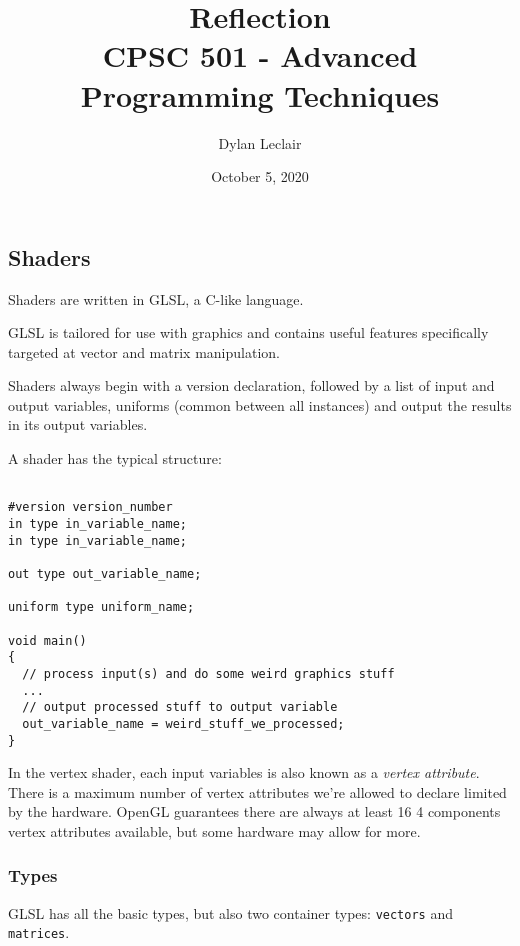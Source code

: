 \documentclass{article}
\begin{document}
\date{October 5, 2020}

\title{Reflection\\
CPSC 501 - Advanced Programming Techniques}
\author{Dylan Leclair}




\maketitle
\newpage


\setlength\parindent{0pt}
\setlength{\parskip}{6pt}

\subsection{Shaders}

Shaders are written in GLSL, a C-like language. 

GLSL is tailored for use with graphics and contains useful features specifically targeted at vector and matrix manipulation. 

Shaders always begin with a version declaration, followed by a list of input and output variables, uniforms (common between all instances) and output the results in its output variables. 

A shader has the typical structure:

\begin{Verbatim}
    
#version version_number
in type in_variable_name;
in type in_variable_name;

out type out_variable_name;
  
uniform type uniform_name;
  
void main()
{
  // process input(s) and do some weird graphics stuff
  ...
  // output processed stuff to output variable
  out_variable_name = weird_stuff_we_processed;
}
\end{Verbatim}

In the vertex shader, each input variables is also known as a \emph{vertex attribute}. There is a maximum number of vertex attributes we're allowed to declare limited by the hardware. OpenGL guarantees there are always at least 16 4 components vertex attributes available, but some hardware may allow for more.

\subsubsection{Types}

GLSL has all the basic types, but also two container types: \texttt{vectors} and \texttt{matrices}.
\end{document}
